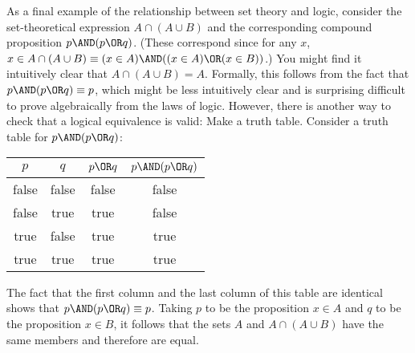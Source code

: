 \medbreak

As a final example of the relationship between set theory and logic,
consider the set-theoretical expression $A\cap (A\cup B)$ and
the corresponding compound proposition $p\AND(p\OR q)$.  (These
correspond since for any $x$, $x\in A\cap(A\cup B) \equiv
(x\in A)\AND ((x\in A)\OR (x\in B))$.)  You might find it intuitively
clear that $A\cap(A\cup B)=A$.  Formally, this follows from the
fact that $p\AND(p\OR q)\equiv p$, which might be less intuitively
clear and is surprising difficult to prove algebraically from the laws
of logic.  However, there is another way to check that a logical
equivalence is valid: Make a truth table.  Consider a truth table
for $p\AND(p\OR q)$:
   \begin{center}
     \begin{tabular}{|c|c||c|c|}
        \hline
        $p$& $q$& $p\OR q$& $p\AND (p\OR q)$\\
        \hline
        \strut 
        false&  false&  false&  false\\
        false&  true&   true&   false \\
        true&   false&  true&   true \\
        true&   true&   true&   true  \\
        \hline
      \end{tabular}
   \end{center}
The fact that the first column and the last column of this table are
identical shows that $p\AND(p\OR q)\equiv p$.  Taking $p$ to 
be the proposition $x\in A$ and $q$ to be the proposition $x\in B$,
it follows that the sets $A$ and $A\cap (A\cup B)$ have the same
members and therefore are equal.


